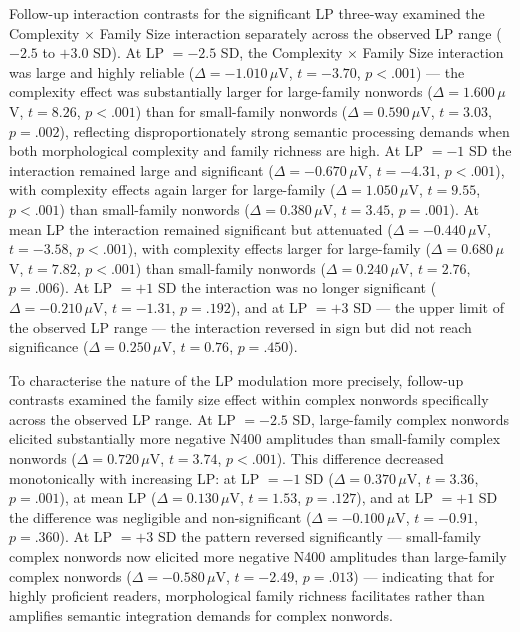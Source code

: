 \documentclass[utf8]{FrontiersinHarvard} %
\begin{document}
	Follow-up interaction contrasts for the significant LP three-way examined the Complexity $\times$ Family Size interaction separately across the observed LP range ($-2.5$ to $+3.0$ SD). At LP $= -2.5$ SD, the Complexity $\times$ Family Size interaction was large and highly reliable ($\Delta = -1.010\,\mu$V, $t = -3.70$, $p < .001$) --- the complexity effect was substantially larger for large-family nonwords ($\Delta = 1.600\,\mu$V, $t = 8.26$, $p < .001$) than for small-family nonwords ($\Delta = 0.590\,\mu$V, $t = 3.03$, $p = .002$), reflecting disproportionately strong semantic processing demands when both morphological complexity and family richness are high. At LP $= -1$ SD the interaction remained large and significant ($\Delta = -0.670\,\mu$V, $t = -4.31$, $p < .001$), with complexity effects again larger for large-family ($\Delta = 1.050\,\mu$V, $t = 9.55$, $p < .001$) than small-family nonwords ($\Delta = 0.380\,\mu$V, $t = 3.45$, $p = .001$). At mean LP the interaction remained significant but attenuated ($\Delta = -0.440\,\mu$V, $t = -3.58$, $p < .001$), with complexity effects larger for large-family ($\Delta = 0.680\,\mu$V, $t = 7.82$, $p < .001$) than small-family nonwords ($\Delta = 0.240\,\mu$V, $t = 2.76$, $p = .006$). At LP $= +1$ SD the interaction was no longer significant ($\Delta = -0.210\,\mu$V, $t = -1.31$, $p = .192$), and at LP $= +3$ SD --- the upper limit of the observed LP range --- the interaction reversed in sign but did not reach significance ($\Delta = 0.250\,\mu$V, $t = 0.76$, $p = .450$).
	
	To characterise the nature of the LP modulation more precisely, follow-up contrasts examined the family size effect within complex nonwords specifically across the observed LP range. At LP $= -2.5$ SD, large-family complex nonwords elicited substantially more negative N400 amplitudes than small-family complex nonwords ($\Delta = 0.720\,\mu$V, $t = 3.74$, $p < .001$). This difference decreased monotonically with increasing LP: at LP $= -1$ SD ($\Delta = 0.370\,\mu$V, $t = 3.36$, $p = .001$), at mean LP ($\Delta = 0.130\,\mu$V, $t = 1.53$, $p = .127$), and at LP $= +1$ SD the difference was negligible and non-significant ($\Delta = -0.100\,\mu$V, $t = -0.91$, $p = .360$). At LP $= +3$ SD the pattern reversed significantly --- small-family complex nonwords now elicited more negative N400 amplitudes than large-family complex nonwords ($\Delta = -0.580\,\mu$V, $t = -2.49$, $p = .013$) --- indicating that for highly proficient readers, morphological family richness facilitates rather than amplifies semantic integration demands for complex nonwords.
	
\end{document}
